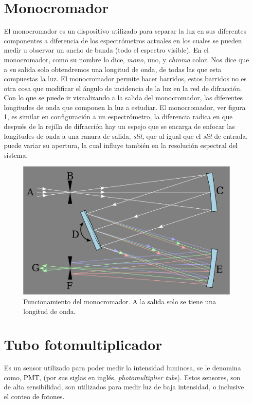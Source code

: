\section{Monocromador}
El monocromador es un dispositivo utilizado para separar la luz en sus diferentes componentes a diferencia de los espectrómetros actuales en los cuales se pueden medir u observar un ancho de banda (todo el espectro visible). En el monocromador, como su nombre lo dice, \textit{mono}, uno, y \textit{chroma} color. Nos dice que a su salida solo obtendremos una longitud de onda, de todas las que esta compuestas la luz.
El monocromador permite hacer barridos, estos barridos no es otra cosa que modificar el
ángulo de incidencia de la luz en la red de difracción. Con lo que se puede ir visualizando a la salida del monocromador, las diferentes longitudes de onda que componen la luz a estudiar. El monocromador, ver figura \ref{fig:1280px-czerny-turnermonochromator}, es similar en configuración a un espectrómetro, la diferencia radica en que después de la rejilla de difracción hay un espejo que se encarga de enfocar las longitudes de onda a una ranura de salida, \textit{slit}, que al igual que el \textit{slit} de entrada, puede variar su apertura, la cual influye también en la resolución espectral del sistema.
\begin{figure}[h]
	\centering
	\includegraphics[width=0.4\linewidth]{Imagenes/1280px-Czerny-Turner_Monochromator}
	\caption{Funcionamiento del monocromador. A la salida solo se tiene una longitud de onda. \cite{Czerny-Turney-Conf}}
	\label{fig:1280px-czerny-turnermonochromator}
	
\end{figure}



\section{Tubo fotomultiplicador}
Es un sensor utilizado para poder medir la intensidad luminosa, se le denomina como, PMT, (por sus siglas en inglés, \textit{photomultiplier tube}). Estos sensores, son de alta sensibilidad, son utilizados para medir luz de baja intensidad, o inclusive el conteo de fotones. 

